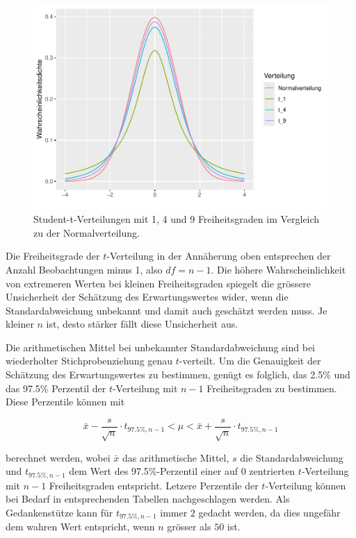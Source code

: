 \documentclass[
]{book}
\theoremstyle{definition}
\theoremstyle{definition}
\theoremstyle{definition}
\theoremstyle{definition}
\theoremstyle{remark}
\begin{document}
\begin{figure}

{\centering \includegraphics{aps_statistik1_files/figure-latex/t-distribution-1} 

}

\caption{Student-t-Verteilungen mit 1, 4 und 9 Freiheitsgraden im Vergleich zu der Normalverteilung.}\label{fig:t-distribution}
\end{figure}

Die Freiheitsgrade der \(t\)-Verteilung in der Annäherung oben entsprechen der Anzahl Beobachtungen minus 1, also \(df = n-1\). Die höhere Wahrscheinlichkeit von extremeren Werten bei kleinen Freiheitsgraden spiegelt die grössere Unsicherheit der Schätzung des Erwartungswertes wider, wenn die Standardabweichung unbekannt und damit auch geschätzt werden muss. Je kleiner \(n\) ist, desto stärker fällt diese Unsicherheit aus.

Die arithmetischen Mittel bei unbekannter Standardabweichung sind bei wiederholter Stichprobenziehung genau \(t\)-verteilt. Um die Genauigkeit der Schätzung des Erwartungswertes zu bestimmen, genügt es folglich, das 2.5\% und das 97.5\% Perzentil der \(t\)-Verteilung mit \(n-1\) Freiheitsgraden zu bestimmen. Diese Perzentile können mit

\begin{equation}
\bar{x} - \frac{s}{\sqrt{n}} \cdot t_{97.5\%, n-1} < \mu < \bar{x} + \frac{s}{\sqrt{n}} \cdot t_{97.5\%, n-1}\label{eq:ki-mean}
\end{equation}

berechnet werden, wobei \(\bar{x}\) das arithmetische Mittel, \(s\) die Standardabweichung und \(t_{97.5\%, n-1}\) dem Wert des 97.5\%-Perzentil einer auf 0 zentrierten \(t\)-Verteilung mit \(n-1\) Freiheitsgraden entspricht. Letzere Perzentile der \(t\)-Verteilung können bei Bedarf in entsprechenden Tabellen nachgeschlagen werden. Als Gedankenstütze kann für \(t_{97.5\%, n-1}\) immer \(2\) gedacht werden, da dies ungefähr dem wahren Wert entspricht, wenn \(n\) grösser als \(50\) ist.
\end{document}
